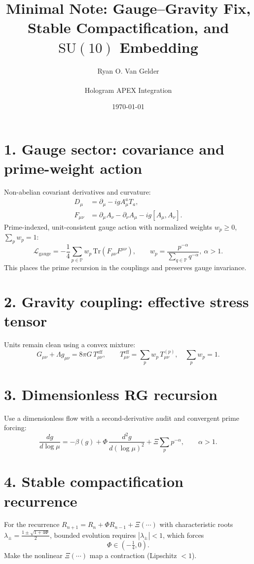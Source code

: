 \documentclass[11pt]{article}
\title{Minimal Note: Gauge--Gravity Fix, Stable Compactification, and $\mathrm{SU}(10)$ Embedding}
\author{Ryan O. Van Gelder \\ \\ Hologram APEX Integration}
\date{\today}
\begin{document}
\maketitle

\section*{1. Gauge sector: covariance and prime-weight action}
Non-abelian covariant derivatives and curvature:
\begin{align*}
D_\mu &= \partial_\mu - i g A_\mu^a T_a,\\
F_{\mu\nu} &= \partial_\mu A_\nu - \partial_\nu A_\mu - i g [A_\mu,A_\nu].
\end{align*}
Prime-indexed, unit-consistent gauge action with normalized weights $w_p\ge 0$, $\sum_p w_p=1$:
\begin{equation*}
\mathcal L_{\mathrm{gauge}} = -\frac{1}{4}\sum_{p\in\mathbb P} w_p\, \mathrm{Tr}\!\left(F_{\mu\nu}F^{\mu\nu}\right),
\qquad w_p = \frac{p^{-\alpha}}{\sum_{q\in\mathbb P} q^{-\alpha}},\ \alpha>1.
\end{equation*}
This places the prime recursion in the couplings and preserves gauge invariance.

\section*{2. Gravity coupling: effective stress tensor}
Units remain clean using a convex mixture:
\begin{equation*}
G_{\mu\nu}+\Lambda g_{\mu\nu}=8\pi G\, T^{\mathrm{eff}}_{\mu\nu},\qquad
T^{\mathrm{eff}}_{\mu\nu}=\sum_{p} w_p\, T^{(p)}_{\mu\nu},\quad \sum_p w_p=1.
\end{equation*}

\section*{3. Dimensionless RG recursion}
Use a dimensionless flow with a second-derivative audit and convergent prime forcing:
\begin{equation*}
\frac{dg}{d\log\mu} = -\beta(g) + \Phi\,\frac{d^2 g}{d(\log\mu)^2} + \Xi \sum_{p} p^{-\alpha},\qquad \alpha>1.
\end{equation*}

\section*{4. Stable compactification recurrence}
For the recurrence $R_{n+1}=R_n+\Phi R_{n-1}+\Xi(\cdots)$ with characteristic roots 
$\lambda_{\pm}=\tfrac{1\pm\sqrt{1+4\Phi}}{2}$, bounded evolution requires $|\lambda_{\pm}|<1$, which forces
\begin{equation*}
\Phi\in(-\tfrac14,0).
\end{equation*}
Make the nonlinear $\Xi(\cdots)$ map a contraction (Lipschitz $<1$).
\end{document}

